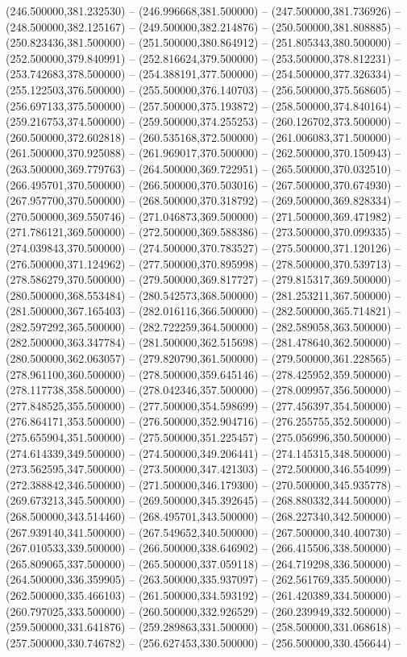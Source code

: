 (246.500000,381.232530) -- (246.996668,381.500000) -- (247.500000,381.736926) -- (248.500000,382.125167) -- (249.500000,382.214876) -- (250.500000,381.808885) -- (250.823436,381.500000) -- (251.500000,380.864912) -- (251.805343,380.500000) -- (252.500000,379.840991) -- (252.816624,379.500000) -- (253.500000,378.812231) -- (253.742683,378.500000) -- (254.388191,377.500000) -- (254.500000,377.326334) -- (255.122503,376.500000) -- (255.500000,376.140703) -- (256.500000,375.568605) -- (256.697133,375.500000) -- (257.500000,375.193872) -- (258.500000,374.840164) -- (259.216753,374.500000) -- (259.500000,374.255253) -- (260.126702,373.500000) -- (260.500000,372.602818) -- (260.535168,372.500000) -- (261.006083,371.500000) -- (261.500000,370.925088) -- (261.969017,370.500000) -- (262.500000,370.150943) -- (263.500000,369.779763) -- (264.500000,369.722951) -- (265.500000,370.032510) -- (266.495701,370.500000) -- (266.500000,370.503016) -- (267.500000,370.674930) -- (267.957700,370.500000) -- (268.500000,370.318792) -- (269.500000,369.828334) -- (270.500000,369.550746) -- (271.046873,369.500000) -- (271.500000,369.471982) -- (271.786121,369.500000) -- (272.500000,369.588386) -- (273.500000,370.099335) -- (274.039843,370.500000) -- (274.500000,370.783527) -- (275.500000,371.120126) -- (276.500000,371.124962) -- (277.500000,370.895998) -- (278.500000,370.539713) -- (278.586279,370.500000) -- (279.500000,369.817727) -- (279.815317,369.500000) -- (280.500000,368.553484) -- (280.542573,368.500000) -- (281.253211,367.500000) -- (281.500000,367.165403) -- (282.016116,366.500000) -- (282.500000,365.714821) -- (282.597292,365.500000) -- (282.722259,364.500000) -- (282.589058,363.500000) -- (282.500000,363.347784) -- (281.500000,362.515698) -- (281.478640,362.500000) -- (280.500000,362.063057) -- (279.820790,361.500000) -- (279.500000,361.228565) -- (278.961100,360.500000) -- (278.500000,359.645146) -- (278.425952,359.500000) -- (278.117738,358.500000) -- (278.042346,357.500000) -- (278.009957,356.500000) -- (277.848525,355.500000) -- (277.500000,354.598699) -- (277.456397,354.500000) -- (276.864171,353.500000) -- (276.500000,352.904716) -- (276.255755,352.500000) -- (275.655904,351.500000) -- (275.500000,351.225457) -- (275.056996,350.500000) -- (274.614339,349.500000) -- (274.500000,349.206441) -- (274.145315,348.500000) -- (273.562595,347.500000) -- (273.500000,347.421303) -- (272.500000,346.554099) -- (272.388842,346.500000) -- (271.500000,346.179300) -- (270.500000,345.935778) -- (269.673213,345.500000) -- (269.500000,345.392645) -- (268.880332,344.500000) -- (268.500000,343.514460) -- (268.495701,343.500000) -- (268.227340,342.500000) -- (267.939140,341.500000) -- (267.549652,340.500000) -- (267.500000,340.400730) -- (267.010533,339.500000) -- (266.500000,338.646902) -- (266.415506,338.500000) -- (265.809065,337.500000) -- (265.500000,337.059118) -- (264.719298,336.500000) -- (264.500000,336.359905) -- (263.500000,335.937097) -- (262.561769,335.500000) -- (262.500000,335.466103) -- (261.500000,334.593192) -- (261.420389,334.500000) -- (260.797025,333.500000) -- (260.500000,332.926529) -- (260.239949,332.500000) -- (259.500000,331.641876) -- (259.289863,331.500000) -- (258.500000,331.068618) -- (257.500000,330.746782) -- (256.627453,330.500000) -- (256.500000,330.456644) -- 